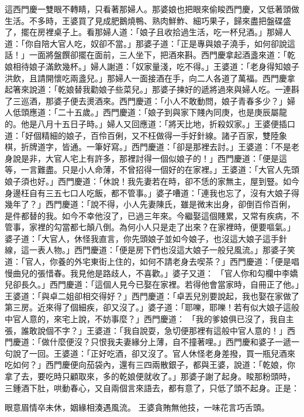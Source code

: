 \begin{showcontents}{}
這西門慶一雙眼不轉睛，只看著那婦人。那婆娘也把眼來偷睃西門慶，又低著頭做生活。不多時，王婆買了見成肥鵝燒鴨、熟肉鮮鮓、細巧果子，歸來盡把盤碟盛了，擺在房裡桌子上。看那婦人道：「娘子且收拾過生活，吃一杯兒酒。」那婦人道：「你自陪大官人吃，奴卻不當。」那婆子道：「正是專與娘子澆手，如何卻說這話！」一面將盤饌卻擺在面前，三人坐下，把酒來斟。西門慶拿起酒盞來道：「乾娘相待娘子滿飲幾杯。」婦人謝道：「奴家量淺，吃不得。」王婆道：「老身得知娘子洪飲，且請開懷吃兩盞兒。」那婦人一面接酒在手，向二人各道了萬福。西門慶拿起箸來說道：「乾娘替我勸娘子些菜兒。」那婆子揀好的遞將過來與婦人吃。一連斟了三巡酒，那婆子便去燙酒來。西門慶道：「小人不敢動問，娘子青春多少？」婦人低頭應道：「二十五歲。」西門慶道：「娘子到與家下賤內同庚，也是庚辰屬龍的。他是八月十五日子時。」婦人又回應道：「將天比地，折殺奴家。」王婆便插口道：「好個精細的娘子，百伶百俐，又不枉做得一手好針線。諸子百家，雙陸象棋，折牌道字，皆通。一筆好寫。」西門慶道：「卻是那裡去討。」王婆道：「不是老身說是非，大官人宅上有許多，那裡討得一個似娘子的！」西門慶道：「便是這等，一言難盡。只是小人命薄，不曾招得一個好的在家裡。」王婆道：「大官人先頭娘子須也好。」西門慶道：「休說！我先妻若在時，卻不恁的家無主，屋到豎。如今身邊枉自有三五七口人吃飯，都不管事。」婆子嘈道：「連我也忘了，沒有大娘子得幾年了？」西門慶道：「說不得，小人先妻陳氏，雖是微末出身，卻倒百伶百俐，是件都替的我。如今不幸他沒了，已過三年來。今繼娶這個賤累，又常有疾病，不管事，家裡的勾當都七顛八倒。為何小人只是走了出來？在家裡時，便要嘔氣。」婆子道：「大官人，休怪我直言，你先頭娘子並如今娘子，也沒這大娘子這手針線，這一表人物。」西門慶道：「便是房下們也沒這大娘子一般兒風流。」那婆子笑道：「官人，你養的外宅東街上住的，如何不請老身去喫茶？」西門慶道：「便是唱慢曲兒的張惜春。我見他是路歧人，不喜歡。」婆子又道： 「官人你和勾欄中李嬌兒卻長久。」西門慶道：「這個人見今已娶在家裡。若得他會當家時，自冊正了他。」王婆道：「與卓二姐卻相交得好？」西門慶道：「卓丟兒別要說起，我也娶在家做了第三房。近來得了個細疾，卻又沒了。」婆子道：「耶嚛，耶嚛！若有似大娘子這般中官人意的，來宅上說，不妨事麼？」西門慶道： 「我的爹娘俱已沒了，我自主張，誰敢說個不字？」王婆道：「我自說耍，急切便那裡有這般中官人意的！」西門慶道：「做什麼便沒？只恨我夫妻緣分上薄，自不撞著哩。」西門慶和婆子一遞一句說了一回。王婆道：「正好吃酒，卻又沒了。官人休怪老身差撥，買一瓶兒酒來吃如何？」西門慶便向茄袋內，還有三四兩散銀子，都與王婆，說道：「乾娘，你拿了去，要吃時只顧取來，多的乾娘便就收了。」那婆子謝了起身。睃那粉頭時，三鍾酒下肚，哄動春心，又自兩個言來語去，都有意了，只低了頭不起身。正是：

眼意眉情卒未休，姻緣相湊遇風流。
王婆貪賄無他技，一味花言巧舌頭。





\end{showcontents}
